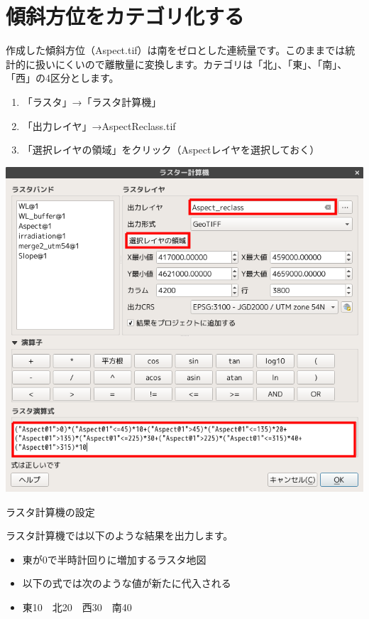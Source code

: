 \documentclass[14Q,twocolumn]{jsarticle}
\makeatletter
\newenvironment{figurehere}
  {\def\@captype{figure}}
  {}
\makeatother
\begin{document}
\section{傾斜方位をカテゴリ化する}
作成した傾斜方位（Aspect.tif）は南をゼロとした連続量です。このままでは統計的に扱いにくいので離散量に変換します。カテゴリは「北」、「東」、「南」、「西」の4区分とします。


\begin{enumerate}
\item 「ラスタ」→「ラスタ計算機」
\item 「出力レイヤ」→AspectReclass.tif
\item 「選択レイヤの領域」をクリック（Aspectレイヤを選択しておく）
\end{enumerate}

\begin{figurehere}
\centering
\includegraphics[width=1\linewidth]{37.png}
\caption{ラスタ計算機の設定}
\end{figurehere}

ラスタ計算機では以下のような結果を出力します。

\begin{itemize}
\item 東が0で半時計回りに増加するラスタ地図
\item 以下の式では次のような値が新たに代入される
\item 東10　北20　西30　南40
\end{itemize}
\end{document}
